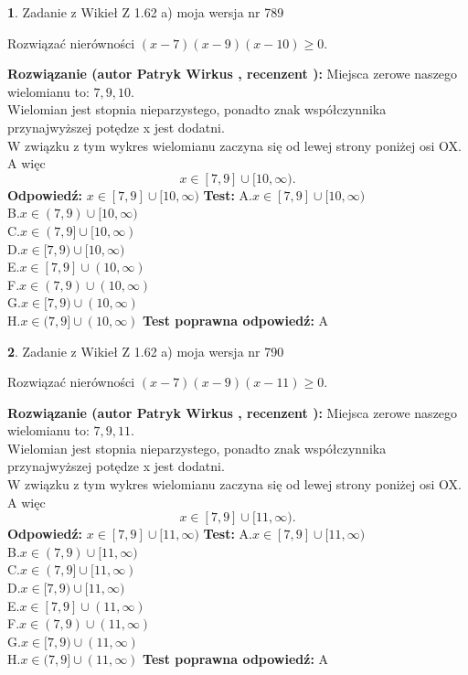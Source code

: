 \documentclass[12pt, a4paper]{article}
\theoremstyle{definition} %
\newtheorem{zad}{}
\newcommand{\zadStart}[1]{\begin{zad}#1\newline}
\newcommand{\zadStop}{\end{zad}}
\newcommand{\rozwStart}[2]{\noindent \textbf{Rozwiązanie (autor #1 , recenzent #2): }\newline}
\newcommand{\rozwStop}{\newline}
\newcommand{\odpStart}{\noindent \textbf{Odpowiedź:}\newline}
\newcommand{\odpStop}{\newline}
\newcommand{\testStart}{\noindent \textbf{Test:}\newline}
\newcommand{\testStop}{\newline}
\newcommand{\kluczStart}{\noindent \textbf{Test poprawna odpowiedź:}\newline}
\newcommand{\kluczStop}{\newline}
\begin{document}
\zadStart{Zadanie z Wikieł Z 1.62 a) moja wersja nr 789}

Rozwiązać nierówności $(x-7)(x-9)(x-10)\ge0$.
\zadStop
\rozwStart{Patryk Wirkus}{}
Miejsca zerowe naszego wielomianu to: $7, 9, 10$.\\
Wielomian jest stopnia nieparzystego, ponadto znak współczynnika przy\linebreak najwyższej potędze x jest dodatni.\\ W związku z tym wykres wielomianu zaczyna się od lewej strony poniżej osi OX. A więc $$x \in [7,9] \cup [10,\infty).$$
\rozwStop
\odpStart
$x \in [7,9] \cup [10,\infty)$
\odpStop
\testStart
A.$x \in [7,9] \cup [10,\infty)$\\
B.$x \in (7,9) \cup [10,\infty)$\\
C.$x \in (7,9] \cup [10,\infty)$\\
D.$x \in [7,9) \cup [10,\infty)$\\
E.$x \in [7,9] \cup (10,\infty)$\\
F.$x \in (7,9) \cup (10,\infty)$\\
G.$x \in [7,9) \cup (10,\infty)$\\
H.$x \in (7,9] \cup (10,\infty)$
\testStop
\kluczStart
A
\kluczStop



\zadStart{Zadanie z Wikieł Z 1.62 a) moja wersja nr 790}

Rozwiązać nierówności $(x-7)(x-9)(x-11)\ge0$.
\zadStop
\rozwStart{Patryk Wirkus}{}
Miejsca zerowe naszego wielomianu to: $7, 9, 11$.\\
Wielomian jest stopnia nieparzystego, ponadto znak współczynnika przy\linebreak najwyższej potędze x jest dodatni.\\ W związku z tym wykres wielomianu zaczyna się od lewej strony poniżej osi OX. A więc $$x \in [7,9] \cup [11,\infty).$$
\rozwStop
\odpStart
$x \in [7,9] \cup [11,\infty)$
\odpStop
\testStart
A.$x \in [7,9] \cup [11,\infty)$\\
B.$x \in (7,9) \cup [11,\infty)$\\
C.$x \in (7,9] \cup [11,\infty)$\\
D.$x \in [7,9) \cup [11,\infty)$\\
E.$x \in [7,9] \cup (11,\infty)$\\
F.$x \in (7,9) \cup (11,\infty)$\\
G.$x \in [7,9) \cup (11,\infty)$\\
H.$x \in (7,9] \cup (11,\infty)$
\testStop
\kluczStart
A
\kluczStop
\end{document}
